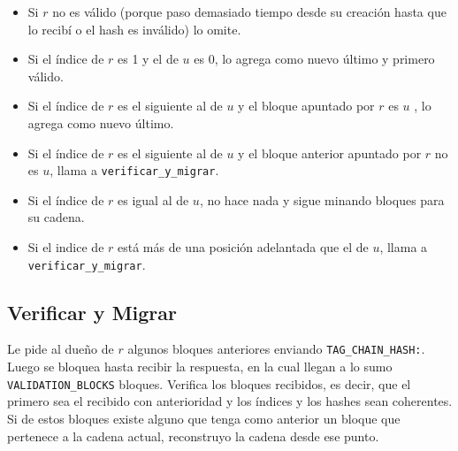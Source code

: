 \begin{itemize}
	\item Si $r$ no es v\'alido (porque paso demasiado tiempo desde su creaci\'on hasta que lo recib\'i o el hash es inv\'alido) lo omite.
	\item Si el \'indice de $r$ es 1 y el de $u$ es 0, lo agrega como nuevo \'ultimo y primero v\'alido.
	\item Si el \'indice de $r$ es el siguiente al de $u$ y el bloque apuntado por $r$ es $u$ , lo agrega como nuevo \'ultimo.
	\item Si el \'indice de $r$ es el siguiente al de $u$ y el bloque anterior apuntado por $r$ no es $u$, llama a \texttt{verificar\_y\_migrar}.
	\item Si el \'indice de $r$ es igual al de $u$, no hace nada y sigue minando bloques para su cadena.
	\item Si el indice de $r$ est\'a m\'as de una posici\'on adelantada que el de $u$, llama a \texttt{verificar\_y\_migrar}.
\end{itemize}


\subsection{Verificar y Migrar}

Le pide al due\~no de $r$ algunos bloques anteriores enviando \texttt{TAG\_CHAIN\_HASH:}. Luego 
se bloquea hasta recibir la respuesta, en la cual llegan a lo sumo \texttt{VALIDATION\_BLOCKS}  bloques.
Verifica los bloques recibidos, es decir, que el primero sea el recibido con anterioridad y los \'indices y los hashes sean coherentes.
Si de estos bloques existe alguno que tenga como anterior un bloque que pertenece a la cadena actual, reconstruyo la cadena desde ese punto.



